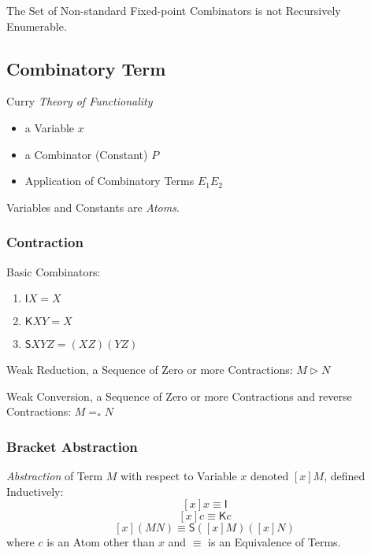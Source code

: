 The Set of Non-standard Fixed-point Combinators is not Recursively
Enumerable. \cite{goldberg05}



\subsection{Combinatory Term}\label{sec:combinatory_term}

Curry \emph{Theory of Functionality}

\begin{itemize}
  \item a Variable $x$
  \item a Combinator (Constant) $P$
  \item Application of Combinatory Terms $E_1 E_2$
\end{itemize}
Variables and Constants are \emph{Atoms}.



\subsubsection{Contraction}\label{sec:combinatory_contraction}
\cite{seldin03}

Basic Combinators:
\begin{enumerate}
  \item $\mathsf{I} X = X$
  \item $\mathsf{K} X Y = X$
  \item $\mathsf{S} X Y Z = (X Z) (Y Z)$
\end{enumerate}

Weak Reduction, a Sequence of Zero or more Contractions: $M \rhd N$

Weak Conversion, a Sequence of Zero or more Contractions and reverse
Contractions: $M =_* N$



\subsubsection{Bracket Abstraction}\label{sec:bracket_abstraction}

\emph{Abstraction} of Term $M$ with respect to Variable $x$ denoted
$[x]M$, defined Inductively:\cite{seldin03}
\[
  [x]x \equiv \mathsf{I}
\]\[
  [x]c \equiv \mathsf{K}c
\]\[
  [x](M N) \equiv \mathsf{S}([x]M)([x]N)
\]
where $c$ is an Atom other than $x$ and $\equiv$ is an Equivalence of
Terms.

